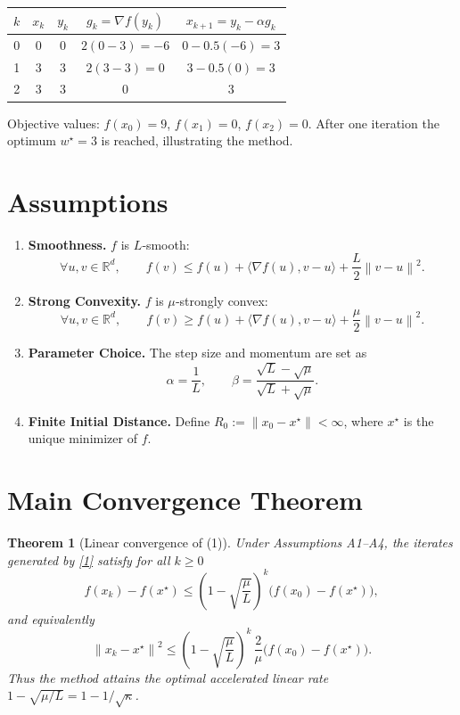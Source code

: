 \documentclass[11pt]{article}
\newtheorem{theorem}{Theorem}
\newcommand{\norm}[1]{\left\|#1\right\|}
\newcommand{\ip}[2]{\langle #1,#2\rangle}
\newcommand{\grad}{\nabla}
\begin{document}
\begin{center}
\begin{tabular}{c|c|c|c|c}
$k$ & $x_k$ & $y_k$ & $g_k=\grad f(y_k)$ & $x_{k+1}=y_k-\alpha g_k$ \\ \hline
0 & $0$ & $0$ & $2(0-3)=-6$ & $0-0.5(-6)=3$ \\
1 & $3$ & $3$ & $2(3-3)=0$ & $3-0.5(0)=3$ \\
2 & $3$ & $3$ & $0$ & $3$ \\
\end{tabular}
\end{center}
Objective values: $f(x_0)=9$, $f(x_1)=0$, $f(x_2)=0$.  
After one iteration the optimum $w^\star=3$ is reached, illustrating the method.

\newpage
\section*{Assumptions}
\begin{enumerate}[label=\textbf{A\arabic*.},leftmargin=*]
\item \textbf{Smoothness.} $f$ is $L$‑smooth:
\[
\forall u,v\in\mathbb{R}^d,\qquad 
f(v)\le f(u)+\ip{\grad f(u)}{v-u}+\frac{L}{2}\norm{v-u}^2.
\tag{A1}
\]
\item \textbf{Strong Convexity.} $f$ is $\mu$‑strongly convex:
\[
\forall u,v\in\mathbb{R}^d,\qquad 
f(v)\ge f(u)+\ip{\grad f(u)}{v-u}+\frac{\mu}{2}\norm{v-u}^2.
\tag{A2}
\]
\item \textbf{Parameter Choice.} The step size and momentum are set as
\[
\alpha=\frac{1}{L},\qquad 
\beta=\frac{\sqrt{L}-\sqrt{\mu}}{\sqrt{L}+\sqrt{\mu}}.
\tag{A3}
\]
\item \textbf{Finite Initial Distance.} Define $R_0:=\norm{x_0-x^\star}<\infty$, where $x^\star$ is the unique minimizer of $f$.
\end{enumerate}

\section*{Main Convergence Theorem}
\begin{theorem}[Linear convergence of (1)]\label{thm:lin}
Under Assumptions A1–A4, the iterates generated by \eqref{1} satisfy for all $k\ge 0$
\[
f(x_k)-f(x^\star)\le \left(1-\sqrt{\frac{\mu}{L}}\right)^{k}\bigl(f(x_0)-f(x^\star)\bigr),
\tag{2}
\]
and equivalently
\[
\norm{x_k-x^\star}^2\le
\left(1-\sqrt{\frac{\mu}{L}}\right)^{k}\,\frac{2}{\mu}\bigl(f(x_0)-f(x^\star)\bigr).
\tag{3}
\]
Thus the method attains the optimal accelerated linear rate $1-\sqrt{\mu/L}=1-1/\sqrt{\kappa}$.
\end{theorem}
\end{document}

